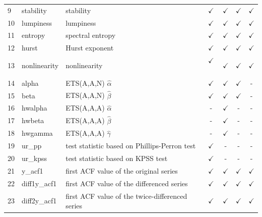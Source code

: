 \documentclass[11pt,a4paper,]{article}
\def\yes{$\checkmark$}
\begin{document}
\begin{table}[!htp]
\begin{tabular}{llp{}cccc}
9  & stability      & stability                                                                               & \yes  & \yes & \yes & \yes\\
10  & lumpiness      & lumpiness                                                                               & \yes  & \yes & \yes & \yes\\
11 & entropy        & spectral entropy                                                                        & \yes  & \yes & \yes & \yes\\
12 & hurst          & Hurst exponent                                                                          & \yes  & \yes & \yes & \yes\\
13 & nonlinearity   & nonlinearity                                                                            & \yes\ & \yes & \yes & \yes\\
14 & alpha          & ETS(A,A,N) $\hat\alpha$                                                                 & \yes  & \yes & \yes & -\\
15 & beta           & ETS(A,A,N) $\hat\beta$                                                                  & \yes  & \yes & \yes & - \\
16 & hwalpha        & ETS(A,A,A) $\hat\alpha$                                                                 & -     & \yes & - & -\\
17 & hwbeta         & ETS(A,A,A) $\hat\beta$                                                                  & -     & \yes & - & - \\
18 & hwgamma        & ETS(A,A,A) $\hat\gamma$                                                                 & -     & \yes & - &-\\
19 & ur\_pp         & test statistic based on Phillips-Perron test                                            & \yes  & - & - & - \\
20 & ur\_kpss       & test statistic based on KPSS test                                                       & \yes  & - & - & - \\
21 & y\_acf1        & first ACF value of the original series                                                  & \yes  & \yes & \yes & \yes\\
22 & diff1y\_acf1   & first ACF value of the differenced series                                               & \yes  & \yes & \yes & \yes\\
23 & diff2y\_acf1   & first ACF value of the twice-differenced series                                         & \yes  & \yes & \yes & \yes\\

\end{tabular}
\end{table}
\end{document}
